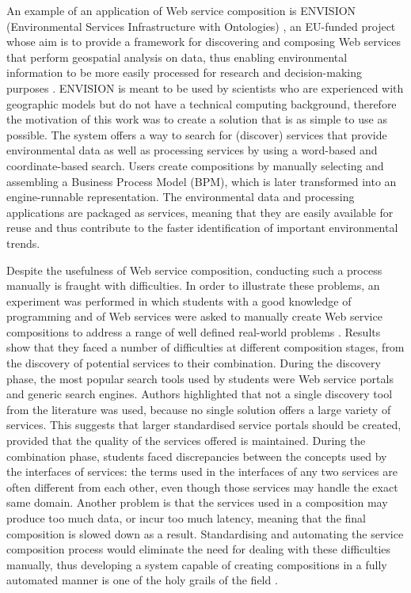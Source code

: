 An example of an application of Web service composition is ENVISION (Environmental Services Infrastructure with Ontologies) \cite{maue2011envision}, an EU-funded project whose aim is to provide a framework for discovering and composing Web services that perform geospatial analysis on data, thus enabling environmental information to be more easily processed for research and decision-making purposes \cite{maue2011envision}. ENVISION is
meant to be used by scientists who are experienced with geographic models but do not have a technical computing background, therefore the motivation of this work was to create a solution that is as simple to use as possible. The system offers
a way to search for (discover) services that provide environmental data as well as processing services by using a
word-based and coordinate-based search. Users create compositions by manually selecting and assembling a Business Process Model (BPM), which is later transformed into an engine-runnable representation. The environmental data and processing applications are packaged as services, meaning that they are easily available for reuse and thus contribute to the faster identification of important environmental trends.

Despite the usefulness of Web service composition, conducting such a process manually is fraught with difficulties. 
In order to illustrate these problems, an experiment was performed in which students with a good knowledge of programming and of Web services were asked to manually create Web service compositions to address a range of well defined real-world problems \cite{lu2007web}. Results show that they faced a number of difficulties at different composition stages, from the discovery of potential services to their combination. During the discovery phase, the most popular search tools used by students were Web service portals and generic search engines. Authors highlighted that not a single discovery tool from the literature was used, because no single solution offers a large variety of services. This suggests that larger standardised service portals should be created, provided that the quality of the services offered is maintained. During the combination phase, students faced discrepancies between the concepts used by the interfaces of services: the terms used in the interfaces of any two services are often different from each other, even though those services may handle the exact same domain. Another problem is that the services used in a composition may produce too much data, or incur too much latency, meaning that the final composition is slowed down as a result. Standardising and automating the service composition process would eliminate the need for dealing with these difficulties manually, thus developing a system capable of creating compositions in a fully automated manner is one of the holy grails of the field \cite{milanovic2004current}.

